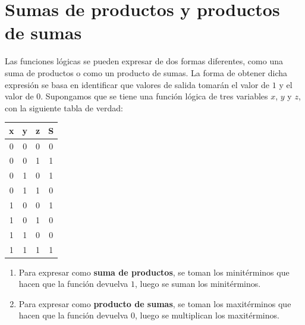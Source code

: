 \documentclass{article}
\begin{document}
\section*{Sumas de productos y productos de sumas}
Las funciones lógicas se pueden expresar de dos formas diferentes, como una suma de productos o como un producto de sumas. La forma de obtener dicha expresión se basa en identificar que valores de salida tomarán el valor de $1$ y el valor de $0$.
\newline Supongamos que se tiene una función lógica de tres variables $x$, $y$ y $z$, con la siguiente tabla de verdad:

\begin{table}[h]
    \centering
    \begin{tabular}{ccc|c}
        \toprule
        \textbf{x} & \textbf{y} & \textbf{z} & \textbf{S}\\
        \midrule
        0 & 0 & 0 & 0\\
        0 & 0 & 1 & 1\\
        0 & 1 & 0 & 1\\
        0 & 1 & 1 & 0\\
        1 & 0 & 0 & 1\\
        1 & 0 & 1 & 0\\
        1 & 1 & 0 & 0\\
        1 & 1 & 1 & 1\\
        \bottomrule
    \end{tabular}
\end{table}

\begin{enumerate}
    \item Para expresar como \textbf{suma de productos}, se toman los minitérminos que hacen que la función devuelva $1$, luego se suman los minitérminos.
    \item Para expresar como \textbf{producto de sumas}, se toman los maxitérminos que hacen que la función devuelva $0$, luego se multiplican los maxitérminos.
\end{enumerate}
\end{document}
